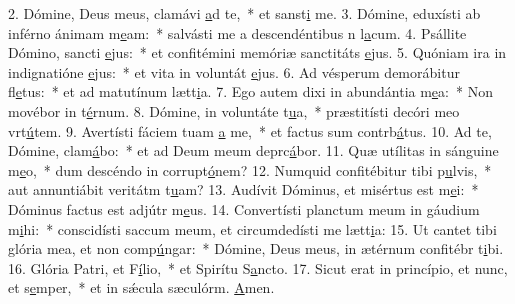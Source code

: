 2. Dómine, Deus meus, clamávi \uline{a}d te,~* et sanst\uline{i} me.
3. Dómine, eduxísti ab inférno ánimam m\uline{e}am:~* salvásti me a descendéntibus n l\uline{a}cum.
4. Psállite Dómino, sancti \uline{e}jus:~* et confitémini memóriæ sanctitáts \uline{e}jus.
5. Quóniam ira in indignatióne \uline{e}jus:~* et vita in voluntát \uline{e}jus.
6. Ad vésperum demorábitur fl\uline{e}tus:~* et ad matutínum lætt\uline{i}a.
7. Ego autem dixi in abundántia m\uline{e}a:~* Non movébor in t\uline{é}rnum.
8. Dómine, in voluntáte t\uline{u}a,~* præstitísti decóri meo vrt\uline{ú}tem.
9. Avertísti fáciem tuam \uline{a} me,~* et factus sum contrb\uline{á}tus.
10. Ad te, Dómine, clam\uline{á}bo:~* et ad Deum meum deprc\uline{á}bor.
11. Quæ utílitas in sánguine m\uline{e}o,~* dum descéndo in corrupt\uline{ó}nem?
12. Numquid confitébitur tibi p\uline{u}lvis,~* aut annuntiábit veritátm t\uline{u}am?
13. Audívit Dóminus, et misértus est m\uline{e}i:~* Dóminus factus est adjútr m\uline{e}us.
14. Convertísti planctum meum in gáudium m\uline{i}hi:~* conscidísti saccum meum, et circumdedísti me lætt\uline{i}a:
15. Ut cantet tibi glória mea, et non comp\uline{ú}ngar:~* Dómine, Deus meus, in ætérnum confitébr t\uline{i}bi.
16. Glória Patri, et F\uline{í}lio,~* et Spirítu S\uline{a}ncto.
17. Sicut erat in princípio, et nunc, et s\uline{e}mper,~* et in sǽcula sæculórm. \uline{A}men.
